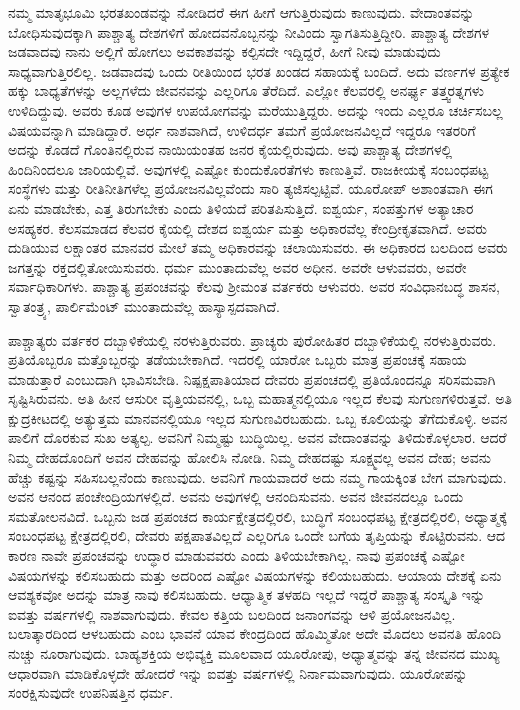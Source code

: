 ನಮ್ಮ ಮಾತೃಭೂಮಿ ಭರತಖಂಡವನ್ನು ನೋಡಿದರೆ ಈಗ ಹೀಗೆ ಆಗುತ್ತಿರುವುದು ಕಾಣುವುದು. ವೇದಾಂತವನ್ನು ಬೋಧಿಸುವುದಕ್ಕಾಗಿ ಪಾಶ್ಚಾತ್ಯ ದೇಶಗಳಿಗೆ ಹೋದವನೊಬ್ಬನನ್ನು ನೀವಿಂದು ಸ್ವಾಗತಿಸುತ್ತಿದ್ದೀರಿ. ಪಾಶ್ಚಾತ್ಯ ದೇಶಗಳ ಜಡವಾದವು ನಾನು ಅಲ್ಲಿಗೆ ಹೋಗಲು ಅವಕಾಶವನ್ನು ಕಲ್ಪಿಸದೇ ಇದ್ದಿದ್ದರೆ, ಹೀಗೆ ನೀವು ಮಾಡುವುದು ಸಾಧ್ಯವಾಗುತ್ತಿರಲಿಲ್ಲ. ಜಡವಾದವು ಒಂದು ರೀತಿಯಿಂದ ಭರತ ಖಂಡದ ಸಹಾಯಕ್ಕೆ ಬಂದಿದೆ. ಅದು ವರ್ಣಗಳ ಪ್ರತ್ಯೇಕ ಹಕ್ಕು ಬಾಧ್ಯತೆಗಳನ್ನು ಅಲ್ಲಗಳೆದು ಜೀವನವನ್ನು ಎಲ್ಲರಿಗೂ ತೆರೆದಿದೆ. ಎಲ್ಲೋ ಕೆಲವರಲ್ಲಿ ಅನರ್ಘ್ಯ ತತ್ತ್ವರತ್ನಗಳು ಉಳಿದಿದ್ದುವು. ಅವರು ಕೂಡ ಅವುಗಳ ಉಪಯೋಗವನ್ನು ಮರೆಯುತ್ತಿದ್ದರು. ಅದನ್ನು ಇಂದು ಎಲ್ಲರೂ ಚರ್ಚಿಸಬಲ್ಲ ವಿಷಯವನ್ನಾಗಿ ಮಾಡಿದ್ದಾರೆ. ಅರ್ಧ ನಾಶವಾಗಿದೆ, ಉಳಿದರ್ಧ ತಮಗೆ ಪ್ರಯೋಜನವಿಲ್ಲದೆ ಇದ್ದರೂ ಇತರರಿಗೆ ಅದನ್ನು ಕೊಡದೆ ಗೊಂತಿನಲ್ಲಿರುವ ನಾಯಿಯಂತಹ ಜನರ ಕೈಯಲ್ಲಿರುವುದು. ಅವು ಪಾಶ್ಚಾತ್ಯ ದೇಶಗಳಲ್ಲಿ ಹಿಂದಿನಿಂದಲೂ ಜಾರಿಯಲ್ಲಿವೆ. ಅವುಗಳಲ್ಲಿ ಎಷ್ಟೋ ಕುಂದುಕೊರತೆಗಳು ಕಾಣುತ್ತಿವೆ. ರಾಜಕೀಯಕ್ಕೆ ಸಂಬಂಧಪಟ್ಟ ಸಂಸ್ಥೆಗಳು ಮತ್ತು ರೀತಿನೀತಿಗಳೆಲ್ಲ ಪ್ರಯೋಜನವಿಲ್ಲವೆಂದು ಸಾರಿ ತ್ಯಜಿಸಲ್ಪಟ್ಟಿವೆ. ಯೂರೋಪ್​ ಅಶಾಂತವಾಗಿ ಈಗ ಏನು ಮಾಡಬೇಕು, ಎತ್ತ ತಿರುಗಬೇಕು ಎಂದು ತಿಳಿಯದೆ ಪರಿತಪಿಸುತ್ತಿದೆ. ಐಶ್ವರ್ಯ, ಸಂಪತ್ತುಗಳ ಅತ್ಯಾಚಾರ ಅಸಹ್ಯಕರ. ಕೆಲಸಮಾಡದ ಕೆಲವರ ಕೈಯಲ್ಲಿ ದೇಶದ ಐಶ್ವರ್ಯ ಮತ್ತು ಅಧಿಕಾರವೆಲ್ಲ ಕೇಂದ್ರೀಕೃತವಾಗಿದೆ. ಅವರು ದುಡಿಯುವ ಲಕ್ಷಾಂತರ ಮಾನವರ ಮೇಲೆ ತಮ್ಮ ಅಧಿಕಾರವನ್ನು ಚಲಾಯಿಸುವರು. ಈ ಅಧಿಕಾರದ ಬಲದಿಂದ ಅವರು ಜಗತ್ತನ್ನು ರಕ್ತದಲ್ಲಿತೋಯಿಸುವರು. ಧರ್ಮ ಮುಂತಾದುವೆಲ್ಲ ಅವರ ಅಧೀನ. ಅವರೇ ಆಳುವವರು, ಅವರೇ ಸರ್ವಾಧಿಕಾರಿಗಳು. ಪಾಶ್ಚಾತ್ಯ ಪ್ರಪಂಚವನ್ನು ಕೆಲವು ಶ‍್ರೀಮಂತ ವರ್ತಕರು ಆಳುವರು. ಅವರ ಸಂವಿಧಾನಬದ್ಧ ಶಾಸನ, ಸ್ವಾತಂತ್ರ್ಯ, ಪಾರ್ಲಿಮೆಂಟ್​ ಮುಂತಾದುವೆಲ್ಲ ಹಾಸ್ಯಾಸ್ಪದವಾಗಿದೆ. 

ಪಾಶ್ಚಾತ್ಯರು ವರ್ತಕರ ದಬ್ಬಾಳಿಕೆಯಲ್ಲಿ ನರಳುತ್ತಿರುವರು. ಪ್ರಾಚ್ಯರು ಪುರೋಹಿತರ ದಬ್ಬಾಳಿಕೆಯಲ್ಲಿ ನರಳುತ್ತಿರುವರು. ಪ್ರತಿಯೊಬ್ಬರೂ ಮತ್ತೊಬ್ಬರನ್ನು ತಡೆಯಬೇಕಾಗಿದೆ. ಇದರಲ್ಲಿ ಯಾರೋ ಒಬ್ಬರು ಮಾತ್ರ ಪ್ರಪಂಚಕ್ಕೆ ಸಹಾಯ ಮಾಡುತ್ತಾರೆ ಎಂಬುದಾಗಿ ಭಾವಿಸಬೇಡಿ. ನಿಷ್ಪಕ್ಷಪಾತಿಯಾದ ದೇವರು ಪ್ರಪಂಚದಲ್ಲಿ ಪ್ರತಿಯೊಂದನ್ನೂ ಸರಿಸಮವಾಗಿ ಸೃಷ್ಟಿಸಿರುವನು. ಅತಿ ಹೀನ ಆಸುರೀ ವೃತ್ತಿಯವನಲ್ಲಿ, ಒಬ್ಬ ಮಹಾತ್ಮನಲ್ಲಿಯೂ ಇಲ್ಲದ ಕೆಲವು ಸುಗುಣಗಳಿರುತ್ತವೆ. ಅತಿ ಕ್ಷುದ್ರಕೀಟದಲ್ಲಿ ಅತ್ಯುತ್ತಮ ಮಾನವನಲ್ಲಿಯೂ ಇಲ್ಲದ ಸುಗುಣವಿರಬಹುದು. ಒಬ್ಬ ಕೂಲಿಯನ್ನು ತೆಗೆದುಕೊಳ್ಳಿ. ಅವನ ಪಾಲಿಗೆ ದೊರಕುವ ಸುಖ ಅತ್ಯಲ್ಪ. ಅವನಿಗೆ ನಿಮ್ಮಷ್ಟು ಬುದ್ಧಿಯಿಲ್ಲ. ಅವನ ವೇದಾಂತವನ್ನು ತಿಳಿದುಕೊಳ್ಳಲಾರ. ಆದರೆ ನಿಮ್ಮ ದೇಹದೊಂದಿಗೆ ಅವನ ದೇಹವನ್ನು ಹೋಲಿಸಿ ನೋಡಿ. ನಿಮ್ಮ ದೇಹದಷ್ಟು ಸೂಕ್ಷ್ಮವಲ್ಲ ಅವನ ದೇಹ; ಅವನು ಹೆಚ್ಚು ಕಷ್ಟನ್ನು ಸಹಿಸಬಲ್ಲನೆಂದು ಕಾಣುವುದು. ಅವನಿಗೆ ಗಾಯವಾದರೆ ಅದು ನಮ್ಮ ಗಾಯಕ್ಕಿಂತ ಬೇಗ ಮಾಗುವುದು. ಅವನ ಆನಂದ ಪಂಚೇಂದ್ರಿಯಗಳಲ್ಲಿದೆ. ಅವನು ಅವುಗಳಲ್ಲಿ ಆನಂದಿಸುವನು. ಅವನ ಜೀವನದಲ್ಲೂ ಒಂದು ಸಮತೋಲನವಿದೆ. ಒಬ್ಬನು ಜಡ ಪ್ರಪಂಚದ ಕಾರ್ಯಕ್ಷೇತ್ರದಲ್ಲಿರಲಿ, ಬುದ್ಧಿಗೆ ಸಂಬಂಧಪಟ್ಟ ಕ್ಷೇತ್ರದಲ್ಲಿರಲಿ, ಅಧ್ಯಾತ್ಮಕ್ಕೆ ಸಂಬಂಧಪಟ್ಟ ಕ್ಷೇತ್ರದಲ್ಲಿರಲಿ, ದೇವರು ಪಕ್ಷಪಾತವಿಲ್ಲದೆ ಎಲ್ಲರಿಗೂ ಒಂದೇ ಬಗೆಯ ತೃಪ್ತಿಯನ್ನು ಕೊಟ್ಟಿರುವನು. ಆದ ಕಾರಣ ನಾವೇ ಪ್ರಪಂಚವನ್ನು ಉದ್ಧಾರ ಮಾಡುವವರು ಎಂದು ತಿಳಿಯಬೇಕಾಗಿಲ್ಲ. ನಾವು ಪ್ರಪಂಚಕ್ಕೆ ಎಷ್ಟೋ ವಿಷಯಗಳನ್ನು ಕಲಿಸಬಹುದು ಮತ್ತು ಅದರಿಂದ ಎಷ್ಟೋ ವಿಷಯಗಳನ್ನು ಕಲಿಯಬಹುದು. ಆಯಾಯ ದೇಶಕ್ಕೆ ಏನು ಆವಶ್ಯಕವೋ ಅದನ್ನು ಮಾತ್ರ ನಾವು ಕಲಿಸಬಹುದು. ಆಧ್ಯಾತ್ಮಿಕ ತಳಹದಿ ಇಲ್ಲದೆ ಇದ್ದರೆ ಪಾಶ್ಚಾತ್ಯ ಸಂಸ್ಕೃತಿ ಇನ್ನು ಐವತ್ತು ವರ್ಷಗಳಲ್ಲಿ ನಾಶವಾಗುವುದು. ಕೇವಲ ಕತ್ತಿಯ ಬಲದಿಂದ ಜನಾಂಗವನ್ನು ಆಳಿ ಪ್ರಯೋಜನವಿಲ್ಲ. ಬಲಾತ್ಕಾರದಿಂದ ಆಳಬಹುದು ಎಂಬ ಭಾವನೆ ಯಾವ ಕೇಂದ್ರದಿಂದ ಹೊಮ್ಮಿತೋ ಅದೇ ಮೊದಲು ಅವನತಿ ಹೊಂದಿ ನುಚ್ಚು ನೂರಾಗುವುದು. ಬಾಹ್ಯಶಕ್ತಿಯ ಅಭಿವ್ಯಕ್ತಿ ಮೂಲವಾದ ಯೂರೋಪು, ಅಧ್ಯಾತ್ಮವನ್ನು ತನ್ನ ಜೀವನದ ಮುಖ್ಯ ಆಧಾರವಾಗಿ ಮಾಡಿಕೊಳ್ಳದೇ ಹೋದರೆ ಇನ್ನು ಐವತ್ತು ವರ್ಷಗಳಲ್ಲಿ ನಿರ್ನಾಮವಾಗುವುದು. ಯೂರೋಪನ್ನು ಸಂರಕ್ಷಿಸುವುದೇ ಉಪನಿಷತ್ತಿನ ಧರ್ಮ. 

